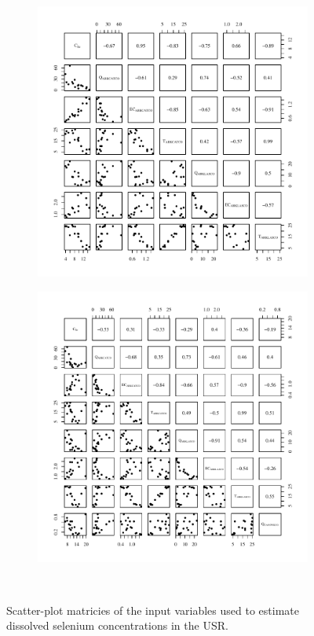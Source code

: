 \begin{landscape}
	\begin{figure}
		\begin{subfigure}{0.7\textwidth}
			\centering
			\includegraphics[width=\tableCustomSize]{"Figures/Results_USR/Stochastic/Conc Model Full PairsU167"}
		\end{subfigure}%
		\begin{subfigure}{0.7\textwidth}
			\centering			
			\includegraphics[width=\tableCustomSize]{"Figures/Results_USR/Stochastic/Conc Model Full PairsCAN"}
		\end{subfigure}\\
		\caption{Scatter-plot matricies of the input variables used to estimate dissolved selenium concentrations in the USR.}
	\end{figure}
\end{landscape}
